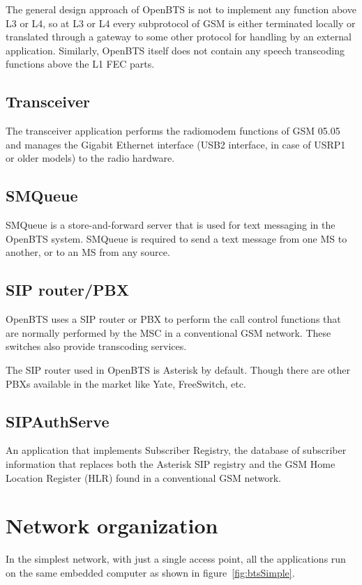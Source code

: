 The general design approach of OpenBTS is not to implement any function above L3 or L4, so at L3 or L4
every subprotocol of GSM is either terminated locally or translated through a gateway to some other protocol
for handling by an external application. Similarly, OpenBTS itself does not contain any speech transcoding
functions above the L1 FEC parts.


\subsection{Transceiver}
The transceiver application performs the radiomodem functions of GSM 05.05 and manages 
the Gigabit Ethernet interface
(USB2 interface, in case
of USRP1 or older models) to the radio hardware.

\subsection{SMQueue}
SMQueue is a store-and-forward server that is used for 
text messaging in the OpenBTS system. SMQueue is required to send 
a text message from one MS to another, or to an MS from any source.

\subsection{SIP router/PBX}

OpenBTS uses a SIP router or PBX to perform the 
call control functions that are normally performed by the MSC
in a conventional GSM network. These switches also provide transcoding 
services.

The SIP router used in OpenBTS is Asterisk by default. Though there are other
PBXs available in the market like Yate, FreeSwitch, etc.

\subsection{SIPAuthServe}
An application that implements Subscriber Registry, the database of subscriber 
information that replaces both the Asterisk SIP registry and the GSM Home 
Location Register (HLR) found in a conventional GSM network.

\section{Network organization}
In the simplest network, with just a single access point, all the applications run
on the same embedded computer as shown in figure~\ref{fig:btsSimple}.

